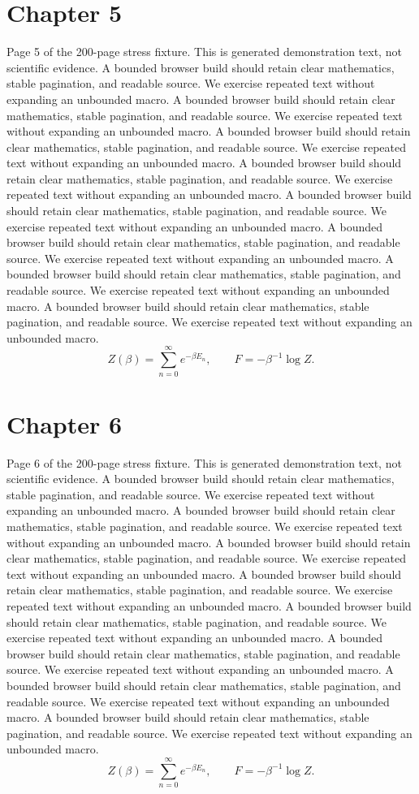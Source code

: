 \documentclass[11pt]{article}
\begin{document}
\section*{Chapter 5}
Page 5 of the 200-page stress fixture. This is generated demonstration text, not scientific evidence.
A bounded browser build should retain clear mathematics, stable pagination, and readable source. We exercise repeated text without expanding an unbounded macro.
A bounded browser build should retain clear mathematics, stable pagination, and readable source. We exercise repeated text without expanding an unbounded macro.
A bounded browser build should retain clear mathematics, stable pagination, and readable source. We exercise repeated text without expanding an unbounded macro.
A bounded browser build should retain clear mathematics, stable pagination, and readable source. We exercise repeated text without expanding an unbounded macro.
A bounded browser build should retain clear mathematics, stable pagination, and readable source. We exercise repeated text without expanding an unbounded macro.
A bounded browser build should retain clear mathematics, stable pagination, and readable source. We exercise repeated text without expanding an unbounded macro.
A bounded browser build should retain clear mathematics, stable pagination, and readable source. We exercise repeated text without expanding an unbounded macro.
A bounded browser build should retain clear mathematics, stable pagination, and readable source. We exercise repeated text without expanding an unbounded macro.
\[Z(\beta)=\sum_{n=0}^{\infty}e^{-\beta E_n},\qquad F=-\beta^{-1}\log Z.\]
\newpage
\section*{Chapter 6}
Page 6 of the 200-page stress fixture. This is generated demonstration text, not scientific evidence.
A bounded browser build should retain clear mathematics, stable pagination, and readable source. We exercise repeated text without expanding an unbounded macro.
A bounded browser build should retain clear mathematics, stable pagination, and readable source. We exercise repeated text without expanding an unbounded macro.
A bounded browser build should retain clear mathematics, stable pagination, and readable source. We exercise repeated text without expanding an unbounded macro.
A bounded browser build should retain clear mathematics, stable pagination, and readable source. We exercise repeated text without expanding an unbounded macro.
A bounded browser build should retain clear mathematics, stable pagination, and readable source. We exercise repeated text without expanding an unbounded macro.
A bounded browser build should retain clear mathematics, stable pagination, and readable source. We exercise repeated text without expanding an unbounded macro.
A bounded browser build should retain clear mathematics, stable pagination, and readable source. We exercise repeated text without expanding an unbounded macro.
A bounded browser build should retain clear mathematics, stable pagination, and readable source. We exercise repeated text without expanding an unbounded macro.
\[Z(\beta)=\sum_{n=0}^{\infty}e^{-\beta E_n},\qquad F=-\beta^{-1}\log Z.\]
\newpage
\end{document}

